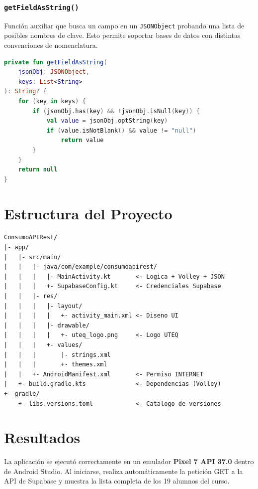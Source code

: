 \documentclass[12pt]{article}
\begin{document}
\subsubsection{\texttt{getFieldAsString()}}
Función auxiliar que busca un campo en un \texttt{JSONObject} probando una lista de posibles nombres de clave. Esto permite soportar bases de datos con distintas convenciones de nomenclatura.

\begin{lstlisting}[language=Kotlin, caption={MainActivity.kt -- búsqueda flexible de campos JSON}]
private fun getFieldAsString(
    jsonObj: JSONObject,
    keys: List<String>
): String? {
    for (key in keys) {
        if (jsonObj.has(key) && !jsonObj.isNull(key)) {
            val value = jsonObj.optString(key)
            if (value.isNotBlank() && value != "null")
                return value
        }
    }
    return null
}
\end{lstlisting}

\section{Estructura del Proyecto}

\begin{lstlisting}[language={}, caption={Árbol de archivos del proyecto Android}]
ConsumoAPIRest/
|- app/
|   |- src/main/
|   |   |- java/com/example/consumoapirest/
|   |   |   |- MainActivity.kt       <- Logica + Volley + JSON
|   |   |   +- SupabaseConfig.kt     <- Credenciales Supabase
|   |   |- res/
|   |   |   |- layout/
|   |   |   |   +- activity_main.xml <- Diseno UI
|   |   |   |- drawable/
|   |   |   |   +- uteq_logo.png     <- Logo UTEQ
|   |   |   +- values/
|   |   |       |- strings.xml
|   |   |       +- themes.xml
|   |   +- AndroidManifest.xml       <- Permiso INTERNET
|   +- build.gradle.kts              <- Dependencias (Volley)
+- gradle/
    +- libs.versions.toml            <- Catalogo de versiones
\end{lstlisting}

\section{Resultados}

La aplicación se ejecutó correctamente en un emulador \textbf{Pixel 7 API 37.0} dentro de Android Studio. Al iniciarse, realiza automáticamente la petición GET a la API de Supabase y muestra la lista completa de los 19 alumnos del curso.
\end{document}

